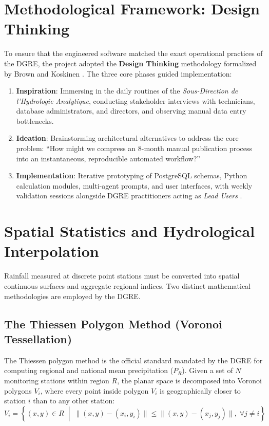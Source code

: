 \documentclass[12pt,a4paper]{report}
\begin{document}
\section{Methodological Framework: Design Thinking}

To ensure that the engineered software matched the exact operational practices of the DGRE, the project adopted the \textbf{Design Thinking} methodology formalized by Brown \cite{brown2009} and Koskinen \cite{koskinen2018}. The three core phases guided implementation:
\begin{enumerate}
  \item \textbf{Inspiration}: Immersing in the daily routines of the \textit{Sous-Direction de l'Hydrologie Analytique}, conducting stakeholder interviews with technicians, database administrators, and directors, and observing manual data entry bottlenecks.
  \item \textbf{Ideation}: Brainstorming architectural alternatives to address the core problem: ``How might we compress an 8-month manual publication process into an instantaneous, reproducible automated workflow?''
  \item \textbf{Implementation}: Iterative prototyping of PostgreSQL schemas, Python calculation modules, multi-agent prompts, and user interfaces, with weekly validation sessions alongside DGRE practitioners acting as \textit{Lead Users} \cite{vonhippel1986}.
\end{enumerate}

\section{Spatial Statistics and Hydrological Interpolation}

Rainfall measured at discrete point stations must be converted into spatial continuous surfaces and aggregate regional indices. Two distinct mathematical methodologies are employed by the DGRE.

\subsection{The Thiessen Polygon Method (Voronoi Tessellation)}
The Thiessen polygon method \cite{thiessen1911} is the official standard mandated by the DGRE for computing regional and national mean precipitation ($P_R$). Given a set of $N$ monitoring stations within region $R$, the planar space is decomposed into Voronoi polygons $V_i$, where every point inside polygon $V_i$ is geographically closer to station $i$ than to any other station:
\begin{equation}
V_i = \left\{ (x, y) \in R \;\middle|\; \|(x,y) - (x_i, y_i)\| \leq \|(x,y) - (x_j, y_j)\|, \;\forall j \neq i \right\}
\label{eq:voronoi}
\end{equation}
\end{document}

